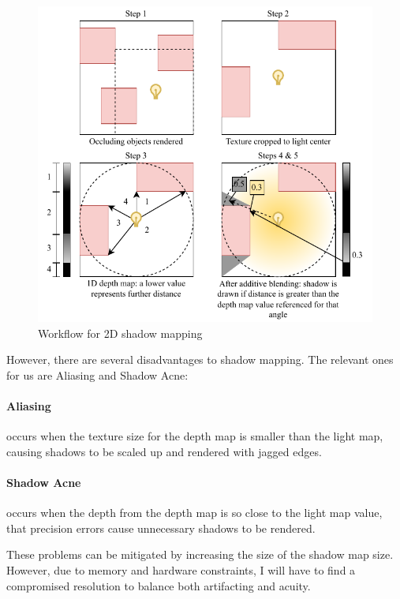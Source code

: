 \documentclass[../main/main.tex]{subfiles}
\begin{document}
\begin{figure}[H]
    \centering
    \includegraphics[width=\columnwidth]{../design/assets/shadow_mapping.pdf}
    \caption{Workflow for 2D shadow mapping}
    \label{fig:shadow-mapping}
\end{figure}

However, there are several disadvantages to shadow mapping. The relevant ones for us are Aliasing and Shadow Acne:

\paragraph{Aliasing} occurs when the texture size for the depth map is smaller than the light map, causing shadows to be scaled up and rendered with jagged edges.

\paragraph{Shadow Acne} occurs when the depth from the depth map is so close to the light map value, that precision errors cause unnecessary shadows to be rendered.

\bigskip

\noindent These problems can be mitigated by increasing the size of the shadow map size. However, due to memory and hardware constraints, I will have to find a compromised resolution to balance both artifacting and acuity.
\end{document}
